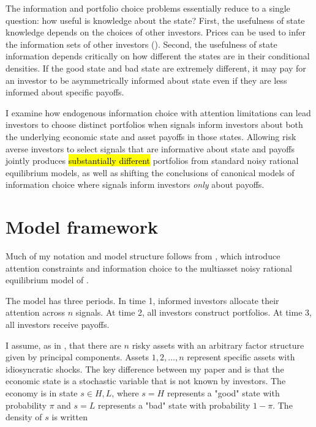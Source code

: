 \documentclass{article}
\begin{document}
The information and portfolio choice problems essentially reduce to a single question: how useful is knowledge about the state? First, the usefulness of state knowledge depends on the choices of other investors. Prices can be used to infer the information sets of other investors (\textcite{grossman_existence_1977}). Second, the usefulness of state information depends critically on how different the states are in their conditional densities. If the good state and bad state are extremely different, it may pay for an investor to be asymmetrically informed about state even if they are less informed about specific payoffs.

I examine how endogenous information choice with attention limitations can lead investors to choose distinct portfolios when signals inform investors about both the underlying economic state and asset payoffs in those states. Allowing risk averse investors to select signals that are informative about state and payoffs jointly produces \hl{substantially different}  portfolios from standard noisy rational equilibrium models, as well as shifting the conclusions of canonical models of information choice where signals inform investors \textit{only} about payoffs.


\section{Model framework}

Much of my notation and model structure follows from \textcite{kacperczyk_rational_2016},  which introduce attention constraints and information choice to the multiasset noisy rational equilibrium model of \textcite{admati_noisy_1985}.

The model has three periods. In time 1, informed investors allocate their attention across $n$ signals. At time 2, all investors construct portfolios. At time 3, all investors receive payoffs.

I assume, as in \textcite{kacperczyk_rational_2016}, that there are $n$ risky assets with an arbitrary factor structure given by principal components. Assets $1,2,\dots,n$ represent specific assets with idiosyncratic shocks. The key difference between my paper and \textcite{kacperczyk_rational_2016} is that the economic state is a stochastic variable that is not known by investors. The economy is in state $s \in {H, L}$, where $s=H$ represents a "good" state with probability $\pi$ and $s=L$ represents a "bad" state with probability $1-\pi$. The density of $s$ is written
\end{document}
